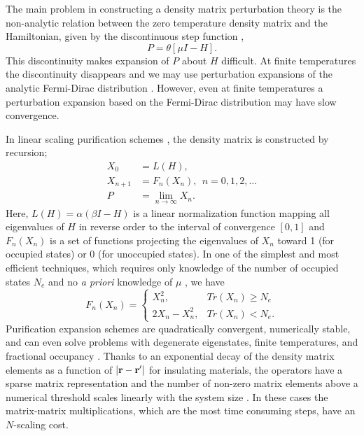 \documentclass[prl,aps,twocolumn,showpacs,twocolumngrid,superbib]{revtex4}
\begin{document}
The main problem in constructing a density matrix perturbation theory is 
the non-analytic relation between the zero temperature density matrix and 
the Hamiltonian, given by the discontinuous step function \cite{Notation},
\begin{equation} \label{DM}
P = \theta[\mu I -  H].
\end{equation}
This discontinuity makes expansion of $P$ about $H$ difficult.
At finite temperatures the discontinuity disappears and we may use perturbation 
expansions of the analytic Fermi-Dirac distribution \cite{Feynman}. 
However, even at finite temperatures a perturbation expansion based
on the Fermi-Dirac distribution may have slow convergence.

In linear scaling purification schemes 
\cite{McWeeny60,Clinton69,Palser98,Holas01,NiklassonWLT,NiklassonSP2,NiklassonSP4}, 
the density matrix is constructed by recursion;
\begin{equation}\label{DM_EXP} \begin{array}{ll}
X_0     & = L(H), \\
X_{n+1} & = F_n(X_n), ~~ n = 0,1,2, \ldots\\
P    & = \lim_{n \rightarrow \infty} X_n. \end{array}
\end{equation}
Here, $L(H) = \alpha(\beta I - H)$ is a linear normalization function \cite{Notation}
mapping all eigenvalues of $H$
in reverse order to the interval of convergence $[0,1]$ and $F_{n}(X_n)$ 
is a set of functions projecting the eigenvalues of $X_n$
toward  1 (for occupied states) or 0 (for unoccupied states). In one of 
the simplest and most efficient techniques, which requires only 
knowledge of the number of occupied states $N_e$ and no {\em a priori} 
knowledge of $\mu$ \cite{NiklassonSP2}, we have 
\begin{equation} \label{SP2}
F_{n}(X_n) = 
\left\{\begin{array}{ll}
X_n^2, &  Tr(X_n) \geq N_e \\
2X_n - X_n^2, & Tr(X_n) < N_e.
\end{array} \right.
\end{equation}
Purification expansion schemes are quadratically convergent, numerically 
stable, and can even solve problems with degenerate eigenstates, finite 
temperatures, and fractional occupancy \cite{NiklassonSP4,NiklassonIP}. Thanks to an 
exponential decay of the density matrix elements as a function of $|{\bf r-r'}|$ 
for insulating materials, the operators have a sparse matrix representation 
and the number of non-zero matrix elements above a numerical threshold
scales linearly with the system size \cite{Goedecker_RMP_99,Wu02}.  
In these cases the matrix-matrix multiplications, 
which are the most time consuming steps, have an $N$-scaling cost.
\end{document}
